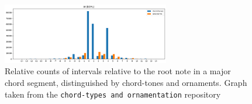 \documentclass[12pt,a4paper,twoside,openany]{report} \usepackage[pdfborder={0 0 0}]{hyperref}    %
\theoremstyle{definition} \newtheorem{definition}{Definition}[section]
\begin{document}
\begin{figure}[ht]
  \begin{center}
    \includegraphics[width=0.65\textwidth]{figs/prep/inferringHarmony/probChordProfile.png}
  \end{center}
  \caption{Relative counts of intervals relative to the root note in a major chord segment, distinguished by chord-tones
  and ornaments. Graph taken from the \texttt{chord-types and ornamentation} repository \cite{finkensiepChordTypesOrnamentation2023}}
  \label{fig:probChordProfile}
\end{figure}





%
\end{document}
